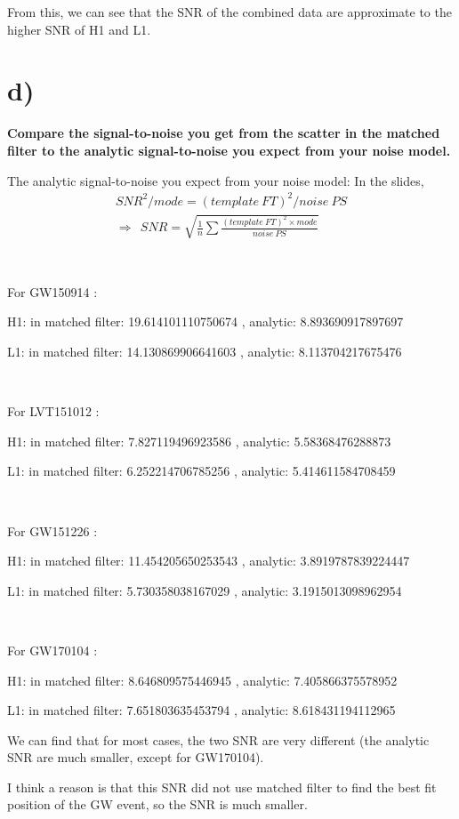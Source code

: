 \documentclass[showpacs, oneside, onecolumn, prl, amsmath, amssymb, nofootinbib, superscriptaddress, notitlepage]{revtex4-1}
\newcommand\bas{\begin{align*}}
\begin{document}
From this, we can see that the SNR of the combined data are approximate to the higher SNR of H1 and L1.

\section{d)}

\textbf{Compare the signal-to-noise you get from the scatter in the matched filter to the analytic signal-to-noise you expect from your noise model.}

The analytic signal-to-noise you expect from your noise model: In the slides,
\bas
SNR^2/mode=(template\ FT)^2/noise\ PS\\
\Rightarrow\ \ SNR=\sqrt{\frac1n\sum \frac{(template\ FT)^2\times mode}{noise\ PS}}
\end{align*}

{\color{gray}
~~~~

For  GW150914 :

H1:   in matched filter: 19.614101110750674 ,	analytic: 8.893690917897697

L1:   in matched filter: 14.130869906641603 ,	analytic: 8.113704217675476

~~~~

For  LVT151012 :

H1:   in matched filter: 7.827119496923586 ,	analytic: 5.58368476288873

L1:   in matched filter: 6.252214706785256 ,	analytic: 5.414611584708459

~~~~

For  GW151226 :

H1:   in matched filter: 11.454205650253543 ,	analytic: 3.8919787839224447

L1:   in matched filter: 5.730358038167029 ,	analytic: 3.1915013098962954

~~~~

For  GW170104 :

H1:   in matched filter: 8.646809575446945 ,	analytic: 7.405866375578952

L1:   in matched filter: 7.651803635453794 ,	analytic: 8.618431194112965
}

We can find that for most cases, the two SNR are very different (the analytic SNR are much smaller, except for GW170104).

I think a reason is that this SNR did not use matched filter to find the best fit position of the GW event, so the SNR is much smaller.
\end{document}
